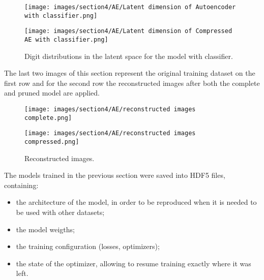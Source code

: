 \documentclass{article}
\begin{document}
\begin{figure}[H]
  \centering
  \begin{minipage}[c]{.4\textwidth}
   {\texttt{[image: images/section4/AE/Latent dimension of Autoencoder with classifier.png]}}
    \end{minipage}
    \qquad \qquad
      \begin{minipage}[c]{0.4\textwidth}
  {\texttt{[image: images/section4/AE/Latent dimension of Compressed AE with classifier.png]}}
     \end{minipage}
     \quad   
   \caption{Digit distributions in the latent space for the model with classifier.}
    \label{fig:latent}
\end{figure}

The last two images of this section represent the original training dataset on the first row and 
for the second row the reconstructed images after both the complete and pruned model are applied.

\begin{figure}[H]
  \centering
  \begin{minipage}[c]{.4\textwidth}
   {\texttt{[image: images/section4/AE/reconstructed images complete.png]}}
    \end{minipage}
    \qquad \qquad
      \begin{minipage}[c]{0.4\textwidth}
  {\texttt{[image: images/section4/AE/reconstructed images compressed.png]}}
     \end{minipage}
     \quad   
   \caption{Reconstructed images.}
    \label{fig:reco}
\end{figure}

\par The models trained in the previous section were saved into HDF5 files, containing:
\begin{itemize}
  \item the architecture of the model, in order to be reproduced when it is needed to be used with other datasets;
  \item the model weigths;
  \item the training configuration (losses, optimizers);
  \item the state of the optimizer, allowing to resume training exactly where it was left.
\end{itemize}

\end{document}
